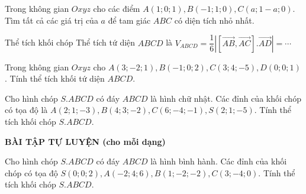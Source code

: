 \begin{bt}%
	Trong không gian $Oxyz$ cho các điểm $A(1;0;1), B(-1;1;0), C(a;1-a;0)$. Tìm tất cả các giá trị của $a$ để tam giác $ABC$ có diện tích nhỏ nhất.
\end{bt}
\begin{dang}{Thể tích khối chóp}
	Thể tích tứ diện $ABCD$ là $V_{ABCD}=\dfrac{1}{6} \left|[\vec{AB},   \vec{AC}].\vec{AD}\right|=\cdots$
\end{dang}

\begin{vd}%
	Trong không gian $Oxyz$ cho $A(3;-2;1), B(-1;0;2), C(3;4;-5), D(0;0;1)$. Tính thể tích khối tứ diện $ABCD$.
\end{vd}

\begin{vd}%
	Cho hình chóp $S.ABCD$ có đáy $ABCD$ là hình chữ nhật. Các đỉnh của khối chóp có tọa độ là $A(2;1;-3), B(4;3;-2), C(6;-4;-1), S(2;1;-5)$. Tính thể tích khối chóp $S.ABCD$.
\end{vd}
\begin{center}
	\textbf{BÀI TẬP TỰ LUYỆN (cho mỗi dạng)}
\end{center}
\begin{bt}%
	Cho hình chóp $S.ABCD$ có đáy $ABCD$ là hình bình hành. Các đỉnh của khối chóp có tọa độ $S(0;0;2), A(-2;4;6), B(1;-2;-2), C(3;-4;0)$. Tính thể tích khối chóp $S.ABCD$.
\end{bt}

